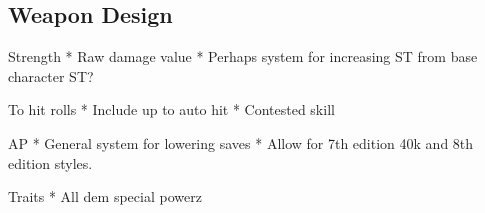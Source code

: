 \begin{multicols*}{2}
	
	\section{Weapon Design}	
	
	Strength
	* Raw damage value
	* Perhaps system for increasing ST from base character ST?
	
	To hit rolls
	* Include up to auto hit
	* Contested skill
	
	AP
	* General system for lowering saves
	* Allow for 7th edition 40k and 8th edition styles.
	
	Traits
	* All dem special powerz
	
\end{multicols*}